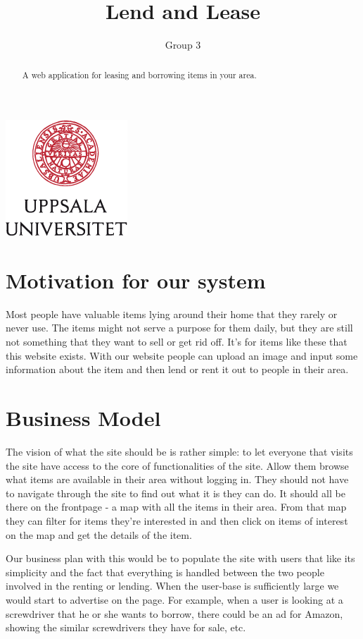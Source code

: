\documentclass[a4paper]{article}
\title{Lend and Lease}
\author{Group 3}
\begin{document}
\maketitle
\begin{center}
\includegraphics{logo.png}\\[1cm]
\begin{abstract}
A web application for leasing and borrowing items in your area.
\end{abstract}
\end{center}
\newpage
\tableofcontents
\newpage

\section{Motivation for our system}
Most people have valuable items lying around their home that they rarely or never use. The items might not serve a purpose for them daily, but they are still not something that they want to sell or get rid off. It’s for items like these that this website exists. 
With our website people can upload an image and input some information about the item and then lend or rent it out to people in their area. 

\section{Business Model}
The vision of what the site should be is rather simple: to let everyone that visits the site have access to the core of functionalities of the site. Allow them browse what items are available in their area without logging in. They should not have to navigate through the site to find out what it is they can do. It should all be there on the frontpage - a map with all the items in their area. From that map they can filter for items they’re interested in and then click on items of interest on the map and get the details of the item.

Our business plan with this would be to populate the site with users that like its simplicity and the fact that everything is handled between the two people involved in the renting or lending. When the user-base is sufficiently large we would start to advertise on the page. For example, when a user is looking at a screwdriver that he or she wants to borrow, there could be an ad for Amazon, showing the similar screwdrivers they have for sale, etc. 
\end{document}
